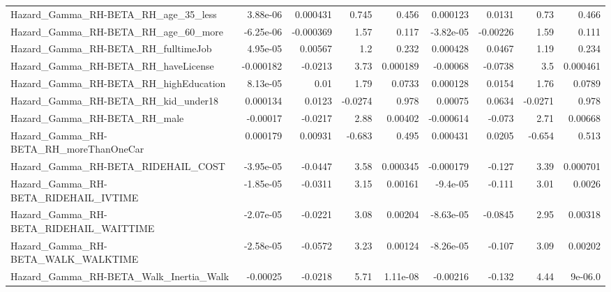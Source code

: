 \begin{tabular}{lrrrrrrrr}
Hazard\_Gamma\_RH-BETA\_RH\_age\_35\_less                &    3.88e-06 &     0.000431 &    0.745 &    0.456 &   0.000123 &      0.0131 &         0.73 &         0.466 \\
Hazard\_Gamma\_RH-BETA\_RH\_age\_60\_more                &   -6.25e-06 &    -0.000369 &     1.57 &    0.117 &  -3.82e-05 &    -0.00226 &         1.59 &         0.111 \\
Hazard\_Gamma\_RH-BETA\_RH\_fulltimeJob                &    4.95e-05 &      0.00567 &      1.2 &    0.232 &   0.000428 &      0.0467 &         1.19 &         0.234 \\
Hazard\_Gamma\_RH-BETA\_RH\_haveLicense                &   -0.000182 &      -0.0213 &     3.73 & 0.000189 &   -0.00068 &     -0.0738 &          3.5 &      0.000461 \\
Hazard\_Gamma\_RH-BETA\_RH\_highEducation              &    8.13e-05 &         0.01 &     1.79 &   0.0733 &   0.000128 &      0.0154 &         1.76 &        0.0789 \\
Hazard\_Gamma\_RH-BETA\_RH\_kid\_under18                &    0.000134 &       0.0123 &  -0.0274 &    0.978 &    0.00075 &      0.0634 &      -0.0271 &         0.978 \\
Hazard\_Gamma\_RH-BETA\_RH\_male                       &    -0.00017 &      -0.0217 &     2.88 &  0.00402 &  -0.000614 &      -0.073 &         2.71 &       0.00668 \\
Hazard\_Gamma\_RH-BETA\_RH\_moreThanOneCar             &    0.000179 &      0.00931 &   -0.683 &    0.495 &   0.000431 &      0.0205 &       -0.654 &         0.513 \\
Hazard\_Gamma\_RH-BETA\_RIDEHAIL\_COST                 &   -3.95e-05 &      -0.0447 &     3.58 & 0.000345 &  -0.000179 &      -0.127 &         3.39 &      0.000701 \\
Hazard\_Gamma\_RH-BETA\_RIDEHAIL\_IVTIME               &   -1.85e-05 &      -0.0311 &     3.15 &  0.00161 &   -9.4e-05 &      -0.111 &         3.01 &        0.0026 \\
Hazard\_Gamma\_RH-BETA\_RIDEHAIL\_WAITTIME             &   -2.07e-05 &      -0.0221 &     3.08 &  0.00204 &  -8.63e-05 &     -0.0845 &         2.95 &       0.00318 \\
Hazard\_Gamma\_RH-BETA\_WALK\_WALKTIME                 &   -2.58e-05 &      -0.0572 &     3.23 &  0.00124 &  -8.26e-05 &      -0.107 &         3.09 &       0.00202 \\
Hazard\_Gamma\_RH-BETA\_Walk\_Inertia\_Walk             &    -0.00025 &      -0.0218 &     5.71 & 1.11e-08 &   -0.00216 &      -0.132 &         4.44 &       9e-06.0 \\

\end{tabular}
